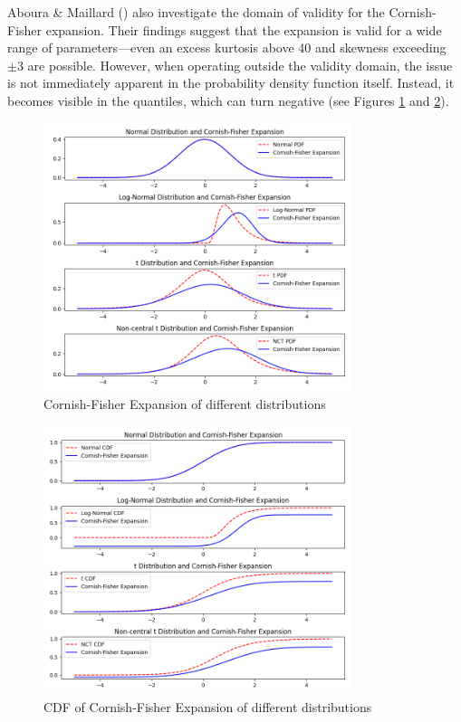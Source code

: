 Aboura \& Maillard (\citeyear{abouraOptionPricingSkewness2016}) also investigate the domain of validity for the Cornish-Fisher expansion. Their findings suggest that the expansion is valid for a wide range of parameters—even an excess kurtosis above 40 and skewness exceeding $\pm3$ are possible. However, when operating outside the validity domain, the issue is not immediately apparent in the probability density function itself. Instead, it becomes visible in the quantiles, which can turn negative (see Figures \ref{fig:cf_expansion} and \ref{fig:cf_expansion_cdf}).

\begin{figure}[h]
    \centering
    \includegraphics[width=0.8\textwidth]{img/cf_expansion.png}
    \caption{Cornish-Fisher Expansion of different distributions}
    \label{fig:cf_expansion}
\end{figure}

\begin{figure}[h]
    \centering
    \includegraphics[width=0.8\textwidth]{img/cf_expansion_cdf.png}
    \caption{CDF of Cornish-Fisher Expansion of different distributions}
    \label{fig:cf_expansion_cdf}
\end{figure}

